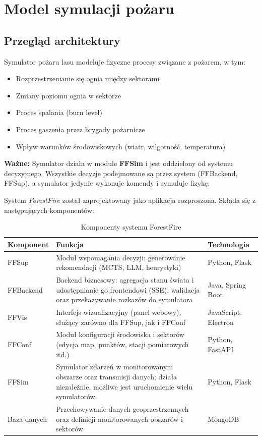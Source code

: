 \section{Model symulacji pożaru}

\subsection{Przegląd architektury}

Symulator pożaru lasu modeluje fizyczne procesy związane z pożarem, w tym:
\begin{itemize}
    \item Rozprzestrzenianie się ognia między sektorami
    \item Zmiany poziomu ognia w sektorze
    \item Proces spalania (burn level)
    \item Proces gaszenia przez brygady pożarnicze
    \item Wpływ warunków środowiskowych (wiatr, wilgotność, temperatura)
\end{itemize}

\textbf{Ważne:} Symulator działa w module \textbf{FFSim} i jest oddzielony od systemu decyzyjnego. Wszystkie decyzje podejmowane są przez system (FFBackend, FFSup), a symulator jedynie wykonuje komendy i symuluje fizykę.



System \textit{ForestFire} został zaprojektowany jako aplikacja rozproszona. 
Składa się z następujących komponentów:

\begin{table}[h!]
\centering
\caption{Komponenty systemu ForestFire}
\label{tab:forestfire_components}
\begin{tabular}{|l|p{7cm}|l|}
\hline
\textbf{Komponent} & \textbf{Funkcja} & \textbf{Technologia} \\ \hline
FFSup &
Moduł wspomagania decyzji: generowanie rekomendacji (MCTS, LLM, heurystyki) &
Python, Flask \\ \hline
FFBackend &
Backend biznesowy: agregacja stanu świata i udostępnianie go frontendowi (SSE), walidacja oraz przekazywanie rozkazów do symulatora &
Java, Spring Boot \\ \hline
FFVis &
Interfejs wizualizacyjny (panel webowy), służący zarówno dla FFSup, jak i FFConf &
JavaScript, Electron \\ \hline
FFConf &
Moduł konfiguracji środowiska i sektorów (edycja map, punktów, stacji pomiarowych itd.) &
Python, FastAPI \\ \hline
FFSim &
Symulator zdarzeń w monitorowanym obszarze oraz transmisji danych; działa niezależnie, możliwe jest uruchomienie wielu symulatorów &
Python, Flask \\ \hline
Baza danych &
Przechowywanie danych geoprzestrzennych oraz definicji monitorowanych obszarów i sektorów &
MongoDB \\ \hline
\end{tabular}
\end{table}

